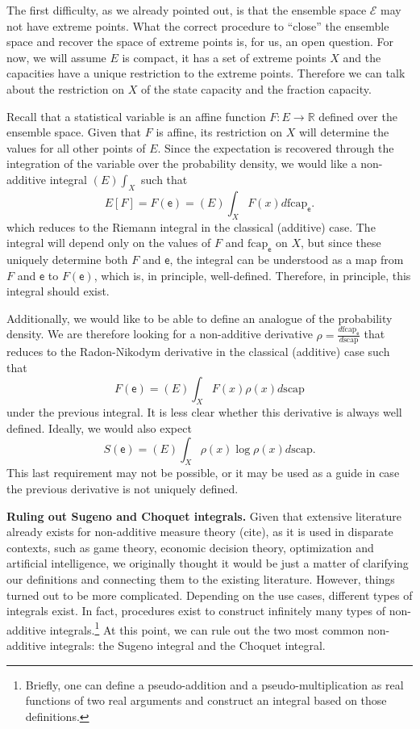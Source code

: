 \documentclass[10pt,twocolumn, nofootinbib]{revtex4-2}
\newcommand\capacity{\mathrm{scap}}
\newcommand\frcap{\mathrm{fcap}}
\newcommand{\ens}[1][e] {\mathsf{#1}} %
\newcommand{\Ens}[1][E] {\mathcal{#1}} %
\begin{document}
The first difficulty, as we already pointed out, is that the ensemble space $\Ens$ may not have extreme points. What the correct procedure to ``close'' the ensemble space and recover the space of extreme points is, for us, an open question. For now, we will assume $E$ is compact, it has a set of extreme points $X$ and the capacities have a unique restriction to the extreme points. Therefore we can talk about the restriction on $X$ of the state capacity and the fraction capacity.

Recall that a statistical variable is an affine function $F : E \to \mathbb{R}$ defined over the ensemble space. Given that $F$ is affine, its restriction on $X$ will determine the values for all other points of $E$. Since the expectation is recovered through the integration of the variable over the probability density, we would like a non-additive integral $(E)\int_X$ such that
\begin{equation}
	E[F] = F(\ens) = (E)\int_X F(x) d\frcap_{\ens}.
\end{equation}
which reduces to the Riemann integral in the classical (additive) case. The integral will depend only on the values of $F$ and $\frcap_{\ens}$ on $X$, but since these uniquely determine both $F$ and $\ens$, the integral can be understood as a map from $F$ and $\ens$ to $F(\ens)$, which is, in principle, well-defined. Therefore, in principle, this integral should exist.

Additionally, we would like to be able to define an analogue of the probability density. We are therefore looking for a non-additive derivative $\rho = \frac{d \frcap_{\ens}}{d \capacity}$ that reduces to the Radon-Nikodym derivative in the classical (additive) case such that
\begin{equation}
	F(\ens) = (E)\int_X F(x) \rho(x) d\capacity
\end{equation}
under the previous integral. It is less clear whether this derivative is always well defined. Ideally, we would also expect
\begin{equation}
	S(\ens) = (E)\int_X \rho(x) \log \rho(x) d\capacity.
\end{equation}
This last requirement may not be possible, or it may be used as a guide in case the previous derivative is not uniquely defined.

\textbf{Ruling out Sugeno and Choquet integrals.} Given that extensive literature already exists for non-additive measure theory (cite), as it is used in disparate contexts, such as game theory, economic decision theory, optimization and artificial intelligence, we originally thought it would be just a matter of clarifying our definitions and connecting them to the existing literature. However, things turned out to be more complicated. Depending on the use cases, different types of integrals exist. In fact, procedures exist\cite{nonadditive2014,pap2013} to construct infinitely many types of non-additive integrals.\footnote{Briefly, one can define a pseudo-addition and a pseudo-multiplication as real functions of two real arguments and construct an integral based on those definitions.} At this point, we can rule out the two most common non-additive integrals: the Sugeno integral and the Choquet integral.
\end{document}
